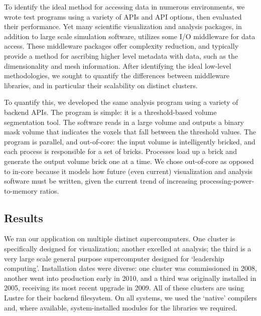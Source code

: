 To identify the ideal method for accessing data in numerous
environments, we wrote test programs using a variety of APIs and
API options, then evaluated their performance.  Yet many scientific
visualization and analysis packages, in addition to large scale
simulation software, utilizes some I/O middleware for data access.
These middleware packages offer complexity reduction, and typically
provide a method for ascribing higher level metadata with data, such as
the dimensionality and mesh information.  After identifying the ideal
low-level methodologies, we sought to quantify the differences between
middleware libraries, and in particular their scalability on distinct
clusters.

To quantify this, we developed the same analysis program using
a variety of backend APIs.  The program is simple: it is a
threshold-based volume segmentation tool.  The software reads in a
large volume and outputs a binary mask volume that indicates the
voxels that fall between the threshold values.  The program is
parallel, and out-of-core: the input volume is intelligently bricked,
and each process is responsible for a set of bricks.  Processes load up
a brick and generate the output volume brick one at a time.  We chose
out-of-core as opposed to in-core because it models how future (even
current) visualization and analysis software must be written, given the
current trend of increasing processing-power-to-memory ratios.

\subsection{Results}

We ran our application on multiple distinct supercomputers.  One
cluster is specifically designed for visualization; another excelled at
analysis; the third is a very large scale general purpose supercomputer
designed for `leadership computing'.  Installation dates were diverse:
one cluster was commissioned in 2008, another went into production
early in 2010, and a third was originally installed in 2005, receiving
its most recent upgrade in 2009.  All of these clusters are using
Lustre for their backend filesystem.  On all systems, we used the
`native' compilers and, where available, system-installed modules for
the libraries we required.


